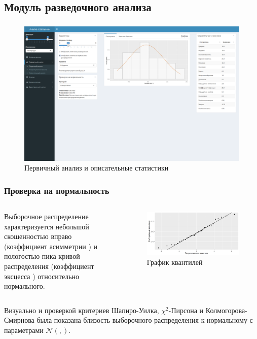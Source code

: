 \documentclass[notheorems]{beamer}
\theoremstyle{definition}
\theoremstyle{example}
\theoremstyle{plain}
\newcommand{\inp}[1]{}
\newcommand{\descriptive}[2]{\inp{#1/descriptive/#2}}
\newcommand{\normaldistr}{$\mathcal{N}(\descriptive{original}{mean}, \descriptive{original}{variance})$}
\begin{document}
\subsection{Модуль разведочного анализа}

\begin{frame}
  \frametitle{\large\secname}
  \framesubtitle{\subsecname}
    \begin{figure}[h]
    \includegraphics[width=1\textwidth]{../../figures/static/1_basis.png}
    \caption{Первичный анализ и описательные статистики}
  \end{figure}
\end{frame}

\begin{frame}
  \frametitle{Проверка на нормальность}
  \begin{columns}[c]
  {\footnotesize
  Выборочное распределение характеризуется небольшой скошенностью вправо (коэффициент асимметрии $ \descriptive{original}{skew} $) и пологостью пика кривой распределения (коэффициент эксцесса $ \descriptive{original}{kurtosis} $) относительно нормального.
  }

  \begin{figure}[h]
    \includegraphics[width=1\linewidth]{../../figures/original/quantile.png}
    \caption{График квантилей}
  \end{figure}
  \end{columns}
  
  \vspace{1em}
  
  Визуально и проверкой критериев Шапиро-Уилка, $\chi^2$-Пирсона и Колмогорова-Смирнова была показана близость выборочного распределения к нормальному с параметрами \normaldistr.
\end{frame}
\end{document}
